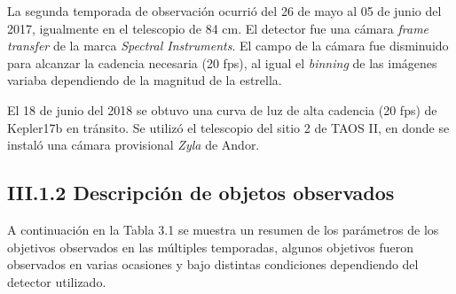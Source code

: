 La segunda temporada de observación ocurrió del 26 de mayo al 05 de junio del 2017, igualmente en el telescopio de 84 cm. El detector fue una cámara \textit{frame transfer} de la marca \textit{Spectral Instruments}. El campo de la cámara fue disminuido para alcanzar la cadencia necesaria (20 fps), al igual el \textit{binning} de las imágenes variaba dependiendo de la magnitud de la estrella.

El 18 de junio del 2018 se obtuvo una curva de luz de alta cadencia (20 fps) de Kepler17b en tránsito. Se utilizó el telescopio del sitio 2 de TAOS II, en donde se instaló una cámara provisional \textit{Zyla} de Andor.

\subsection*{III.1.2 Descripción de objetos observados}

A continuación en la Tabla 3.1 se muestra un resumen de los parámetros de los objetivos observados en las múltiples temporadas, algunos objetivos fueron observados en varias ocasiones y bajo distintas condiciones dependiendo del detector utilizado.




